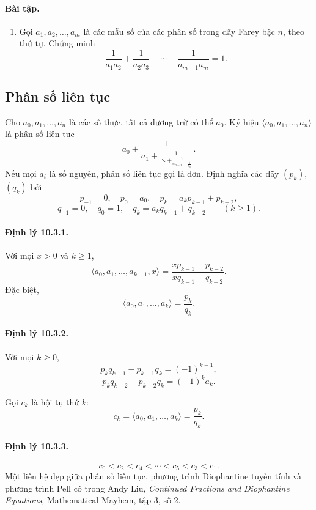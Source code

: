 \documentclass[11pt]{article}
\begin{document}
\paragraph{Bài tập.}
\begin{enumerate}
\item Gọi \(a_1,a_2,\ldots,a_m\) là các mẫu số của các phân số trong dãy Farey
bậc \(n\), theo thứ tự. Chứng minh
\[
 \frac1{a_1a_2}+\frac1{a_2a_3}+\cdots+\frac1{a_{m-1}a_m}=1.
\]
\end{enumerate}

\subsection{Phân số liên tục}

Cho \(a_0,a_1,\ldots,a_n\) là các số thực, tất cả dương trừ có thể \(a_0\).
Ký hiệu \(\langle a_0,a_1,\ldots,a_n\rangle\) là phân số liên tục
\[
 a_0+\frac1{a_1+\frac1{\ddots+\frac1{a_{n-1}+\frac1{a_n}}}}.
\]
Nếu mọi \(a_i\) là số nguyên, phân số liên tục gọi là đơn. Định nghĩa các dãy
\((p_k)\), \((q_k)\) bởi
\[
 p_{-1}=0,\quad p_0=a_0,\quad p_k=a_kp_{k-1}+p_{k-2},
\]
\[
 q_{-1}=0,\quad q_0=1,\quad q_k=a_kq_{k-1}+q_{k-2}\qquad(k\ge1).
\]

\paragraph{Định lý 10.3.1.}
Với mọi \(x>0\) và \(k\ge1\),
\[
 \langle a_0,a_1,\ldots,a_{k-1},x\rangle
 =
 \frac{xp_{k-1}+p_{k-2}}{xq_{k-1}+q_{k-2}}.
\]
Đặc biệt,
\[
 \langle a_0,a_1,\ldots,a_k\rangle=\frac{p_k}{q_k}.
\]

\paragraph{Định lý 10.3.2.}
Với mọi \(k\ge0\),
\[
 p_kq_{k-1}-p_{k-1}q_k=(-1)^{k-1},
\]
\[
 p_kq_{k-2}-p_{k-2}q_k=(-1)^ka_k.
\]

Gọi \(c_k\) là hội tụ thứ \(k\):
\[
 c_k=\langle a_0,a_1,\ldots,a_k\rangle=\frac{p_k}{q_k}.
\]

\paragraph{Định lý 10.3.3.}
\[
 c_0<c_2<c_4<\cdots<c_5<c_3<c_1.
\]
Một liên hệ đẹp giữa phân số liên tục, phương trình Diophantine tuyến tính và
phương trình Pell có trong Andy Liu, \textit{Continued Fractions and
Diophantine Equations}, Mathematical Mayhem, tập 3, số 2.
\end{document}
